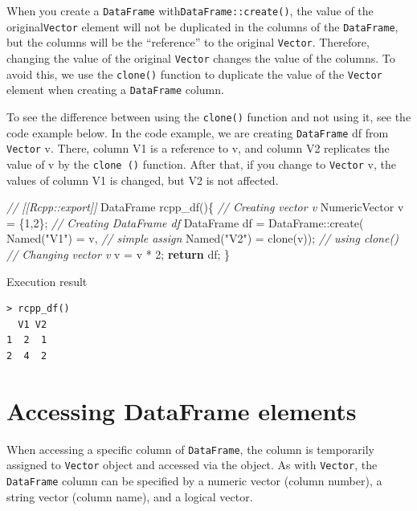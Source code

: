 \documentclass[]{book}
\newenvironment{Shaded}{\begin{snugshade}}{\end{snugshade}}
\newcommand{\DecValTok}[1]{\textcolor[rgb]{0.00,0.00,0.81}{#1}}
\newcommand{\StringTok}[1]{\textcolor[rgb]{0.31,0.60,0.02}{#1}}
\newcommand{\CommentTok}[1]{\textcolor[rgb]{0.56,0.35,0.01}{\textit{#1}}}
\newcommand{\ControlFlowTok}[1]{\textcolor[rgb]{0.13,0.29,0.53}{\textbf{#1}}}
\newcommand{\NormalTok}[1]{#1}
\theoremstyle{definition}
\theoremstyle{definition}
\theoremstyle{remark}
\begin{document}
When you create a \texttt{DataFrame} with\texttt{DataFrame::create()},
the value of the original\texttt{Vector} element will not be duplicated
in the columns of the \texttt{DataFrame}, but the columns will be the
``reference'' to the original \texttt{Vector}. Therefore, changing the
value of the original \texttt{Vector} changes the value of the columns.
To avoid this, we use the \texttt{clone()} function to duplicate the
value of the \texttt{Vector} element when creating a \texttt{DataFrame}
column.

To see the difference between using the \texttt{clone()} function and
not using it, see the code example below. In the code example, we are
creating \texttt{DataFrame} df from \texttt{Vector} v. There, column V1
is a reference to v, and column V2 replicates the value of v by the
\texttt{clone\ ()} function. After that, if you change to
\texttt{Vector} v, the values of column V1 is changed, but V2 is not
affected.

\begin{Shaded}
\begin{Highlighting}[]
\CommentTok{// [[Rcpp::export]]}
\NormalTok{DataFrame rcpp_df()\{}
    \CommentTok{// Creating vector v}
\NormalTok{    NumericVector v = \{}\DecValTok{1}\NormalTok{,}\DecValTok{2}\NormalTok{\};}
    \CommentTok{// Creating DataFrame df}
\NormalTok{    DataFrame df = DataFrame::create( Named(}\StringTok{"V1"}\NormalTok{) = v,         }\CommentTok{// simple assign}
\NormalTok{                                      Named(}\StringTok{"V2"}\NormalTok{) = clone(v)); }\CommentTok{// using clone()}
    \CommentTok{// Changing vector v}
\NormalTok{    v = v * }\DecValTok{2}\NormalTok{;}
    \ControlFlowTok{return}\NormalTok{ df;}
\NormalTok{\}}
\end{Highlighting}
\end{Shaded}

Execution result

\begin{verbatim}
> rcpp_df()
  V1 V2
1  2  1
2  4  2
\end{verbatim}

\section{Accessing DataFrame
elements}\label{accessing-dataframe-elements}

When accessing a specific column of \texttt{DataFrame}, the column is
temporarily assigned to \texttt{Vector} object and accessed via the
object. As with \texttt{Vector}, the \texttt{DataFrame} column can be
specified by a numeric vector (column number), a string vector (column
name), and a logical vector.
\end{document}
